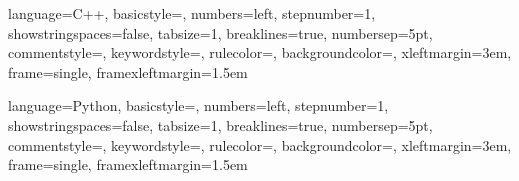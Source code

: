 \newcommand\blank[1][\textwidth]{\noindent\rule[-.2ex]{#1}{.4pt}}
\lstset
{ %
    language=C++,
    basicstyle=\footnotesize,
    numbers=left,
    stepnumber=1,
    showstringspaces=false,
    tabsize=1,
    breaklines=true,
    numbersep=5pt,                   %
    commentstyle=\color{green},    %
    keywordstyle=\color{blue},       %
    rulecolor=\color{black},         %
    backgroundcolor=\color{white},   %
    xleftmargin=3em,
    frame=single,
    framexleftmargin=1.5em
}

\lstset
{ %
    language=Python,
    basicstyle=\footnotesize,
    numbers=left,
    stepnumber=1,
    showstringspaces=false,
    tabsize=1,
    breaklines=true,
    numbersep=5pt,                   %
    commentstyle=\color{green},    %
    keywordstyle=\color{blue},       %
    rulecolor=\color{black},         %
    backgroundcolor=\color{white},   %
    xleftmargin=3em,
    frame=single,
    framexleftmargin=1.5em
}